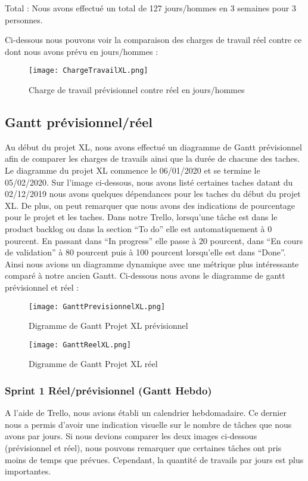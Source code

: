 Total :  Nous avons effectué un total de 127 jours/hommes en 3 semaines pour 3 personnes.

Ci-dessous nous pouvons voir la comparaison des charges de travail réel contre ce dont nous avons prévu en jours/hommes : 

\begin{figure}[h!]
  \centering
  \texttt{[image: ChargeTravailXL.png]}
	\caption[]{Charge de travail prévisionnel contre réel en jours/hommes}
	\label{}
\end{figure}



\subsection{Gantt prévisionnel/réel}
Au début du projet XL, nous avons effectué un diagramme de Gantt prévisionnel afin de comparer les charges de travails ainsi que la durée de chacune des taches. Le diagramme du projet XL commence le 06/01/2020 et se termine le 05/02/2020. 
Sur l’image ci-dessous, nous avons listé certaines taches datant du 02/12/2019 nous avons quelques dépendances pour les taches du début du projet XL. De plus, on peut remarquer que nous avons des indications de pourcentage pour le projet et les taches. Dans notre Trello, lorsqu’une tâche est dans le product backlog ou dans la section “To do” elle est automatiquement à 0 pourcent. En passant dans “In progress” elle passe à 20 pourcent, dans “En cours de validation” à 80 pourcent puis à 100 pourcent lorsqu’elle est dans “Done”. Ainsi nous avions un diagramme dynamique avec une métrique plus intéressante comparé à notre ancien Gantt. Ci-dessous nous avons le diagramme de gantt prévisionnel et réel : 

\begin{figure}[h!]
  \centering
  \texttt{[image: GanttPrevisionnelXL.png]}
	\caption[]{Digramme de Gantt Projet XL prévisionnel}
	\label{}
\end{figure}

\begin{figure}[h!]
  \centering
  \texttt{[image: GanttReelXL.png]}
	\caption[]{Digramme de Gantt Projet XL réel}
	\label{}
\end{figure}


\subsubsection{Sprint 1 Réel/prévisionnel (Gantt Hebdo)}
A l’aide de Trello, nous avions établi un calendrier hebdomadaire. Ce dernier nous a permis d’avoir une indication visuelle sur le nombre de tâches que nous avons par jours. Si nous devions comparer les deux images ci-dessous (prévisionnel et réel), nous pouvons remarquer que certaines tâches ont pris moins de temps que prévues. Cependant, la quantité de travails par jours est plus importantes.

